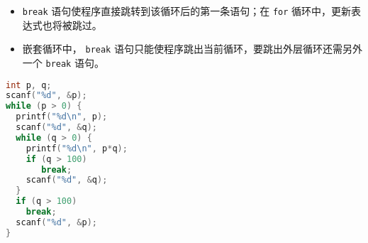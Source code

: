 \begin{frame}[fragile]
\begin{itemize}
\item  \lstinline|break| 语句使程序直接跳转到该循环后的第一条语句；在 \lstinline|for| 循环中，更新表达式也将被跳过。\\[0.1in]
\item 
嵌套循环中， \lstinline|break| 语句只能使程序跳出当前循环，要跳出外层循环还需另外一个 \lstinline|break| 语句。
\end{itemize}
\end{frame}


\begin{frame}[fragile]
\begin{lstlisting}[language=c,frame=single]
int p, q;
scanf("%d", &p);
while (p > 0) {
  printf("%d\n", p);
  scanf("%d", &q);
  while (q > 0) {
    printf("%d\n", p*q);
    if (q > 100)
       break;
    scanf("%d", &q);
  }
  if (q > 100)
    break;
  scanf("%d", &p);
}
\end{lstlisting}
\end{frame}


